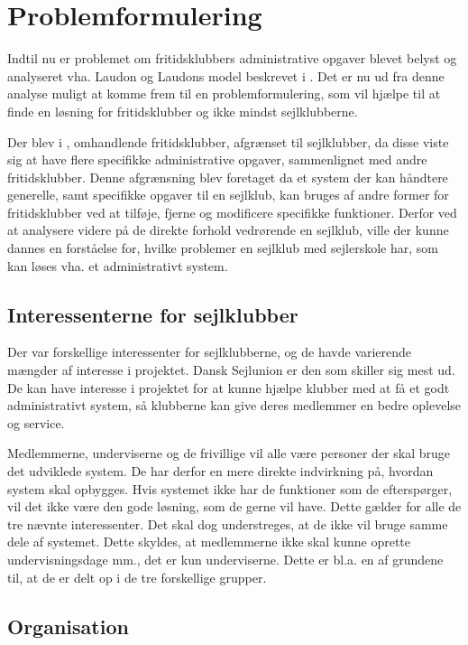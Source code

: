 \chapter{Problemformulering}\label{chap:problemformulering-new}

Indtil nu er problemet om fritidsklubbers administrative opgaver blevet belyst og analyseret vha. Laudon og
Laudons model beskrevet i . Det er nu ud fra denne analyse muligt at
komme frem til en problemformulering, som vil hjælpe til at finde en løsning for fritidsklubber og ikke mindst
sejlklubberne.

Der blev i , omhandlende fritidsklubber, afgrænset til sejlklubber, da disse viste sig
at have flere specifikke administrative opgaver, sammenlignet med andre fritidsklubber. Denne afgrænsning blev foretaget
da et system der kan håndtere generelle, samt specifikke opgaver til en sejlklub, kan bruges af andre former for
fritidsklubber ved at tilføje, fjerne og modificere specifikke funktioner. Derfor ved at analysere videre på de
direkte forhold vedrørende en sejlklub, ville der kunne dannes en forståelse for, hvilke problemer en sejlklub
med sejlerskole har, som kan løses vha. et administrativt system.


\section{Interessenterne for sejlklubber}

Der var forskellige interessenter for sejlklubberne, og de havde varierende mængder af interesse i projektet.
Dansk Sejlunion er den som skiller sig mest ud. De kan have interesse i projektet for at kunne hjælpe klubber
med at få et godt administrativt system, så klubberne kan give deres medlemmer en bedre oplevelse og service.

Medlemmerne, underviserne og de frivillige vil alle være personer der skal bruge det udviklede system. De har
derfor en mere direkte indvirkning på, hvordan system skal opbygges. Hvis systemet ikke har de funktioner som
de efterspørger, vil det ikke være den gode løsning, som de gerne vil have. Dette gælder for alle de tre
nævnte interessenter. Det skal dog understreges, at de ikke vil bruge samme dele af systemet. Dette
skyldes, at medlemmerne ikke skal kunne oprette undervisningsdage mm., det er kun underviserne. Dette er bl.a.
en af grundene til, at de er delt op i de tre forskellige grupper.


\section{Organisation}

